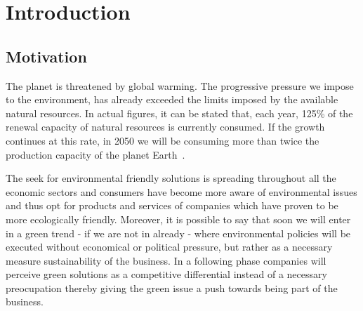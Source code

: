 


\chapter{Introduction} \label{chap1:introduction}



\section{Motivation} \label{sec1:motivation}

    The planet is threatened by global warming. The progressive pressure we impose to the environment, has already exceeded the limits imposed by the available natural resources. In actual figures, it can be stated that, each year, 125\% of the renewal capacity of natural resources is currently consumed. If the growth continues at this rate, in 2050 we will be consuming more than twice the production capacity of the planet Earth~\cite{Townsend:2002:2050}. 
    
    The seek for environmental friendly solutions is spreading throughout all the economic sectors and consumers have become more aware of environmental issues and thus opt for products and services of companies which have proven to be more ecologically friendly. Moreover, it is possible to say that soon we will enter in a green trend - if we are not in already - where environmental policies will be executed without economical or political pressure, but rather as a necessary measure sustainability of the business. In a following phase companies will perceive green solutions as a competitive differential instead of a necessary preocupation thereby giving the green issue a push towards being part of the business.
        
